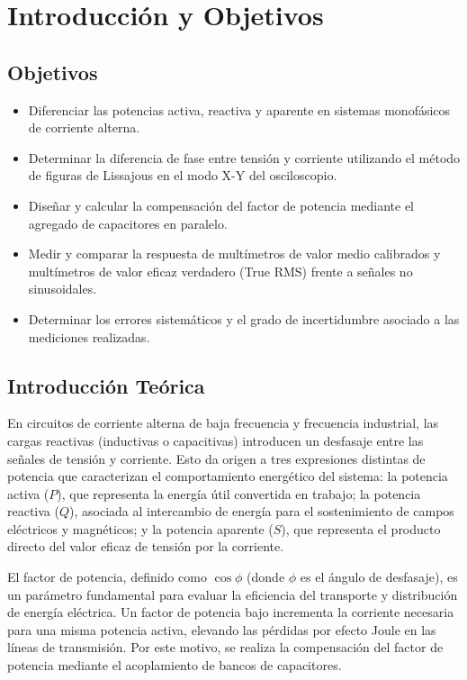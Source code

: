 \chapter{Introducción y Objetivos}

\section{Objetivos}
\begin{itemize}
    \item Diferenciar las potencias activa, reactiva y aparente en sistemas monofásicos de corriente alterna.
    \item Determinar la diferencia de fase entre tensión y corriente utilizando el método de figuras de Lissajous
          en el modo X-Y del osciloscopio.
    \item Diseñar y calcular la compensación del factor de potencia mediante el agregado de capacitores en paralelo.
    \item Medir y comparar la respuesta de multímetros de valor medio calibrados y multímetros de valor eficaz
          verdadero (True RMS) frente a señales no sinusoidales.
    \item Determinar los errores sistemáticos y el grado de incertidumbre asociado a las mediciones realizadas.
\end{itemize}

\section{Introducción Teórica}
En circuitos de corriente alterna de baja frecuencia y frecuencia industrial, las cargas reactivas (inductivas o
capacitivas) introducen un desfasaje entre las señales de tensión y corriente. Esto da origen a tres expresiones
distintas de potencia que caracterizan el comportamiento energético del sistema: la potencia activa ($P$), que representa
la energía útil convertida en trabajo; la potencia reactiva ($Q$), asociada al intercambio de energía para el
sostenimiento de campos eléctricos y magnéticos; y la potencia aparente ($S$), que representa el producto directo del
valor eficaz de tensión por la corriente.

El factor de potencia, definido como $\cos\phi$ (donde $\phi$ es el ángulo de desfasaje), es un parámetro fundamental
para evaluar la eficiencia del transporte y distribución de energía eléctrica. Un factor de potencia bajo incrementa la
corriente necesaria para una misma potencia activa, elevando las pérdidas por efecto Joule en las líneas de transmisión.
Por este motivo, se realiza la compensación del factor de potencia mediante el acoplamiento de bancos de capacitores.


